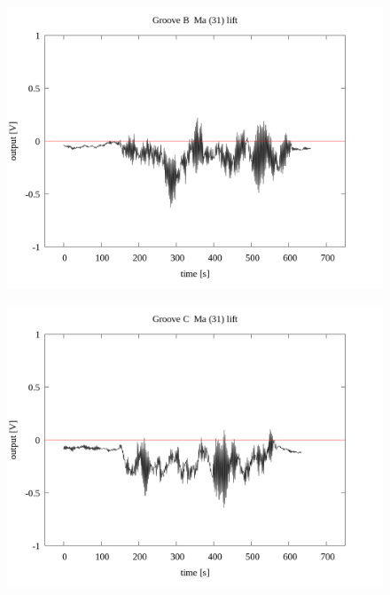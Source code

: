 \documentclass[a4paper]{jsarticle}
\begin{document}
\begin{figure}[htbp]
    \footnotesize
    \begin{center}
        \includegraphics[width=140mm]{../../../33_result/210806/moving_average/31/lift/Groove_B_ma(31)_lift.png}
    \end{center}
\end{figure}

\begin{figure}[htbp]
    \footnotesize
    \begin{center}
        \includegraphics[width=140mm]{../../../33_result/210806/moving_average/31/lift/Groove_C_ma(31)_lift.png}
    \end{center}
\end{figure}
\end{document}
